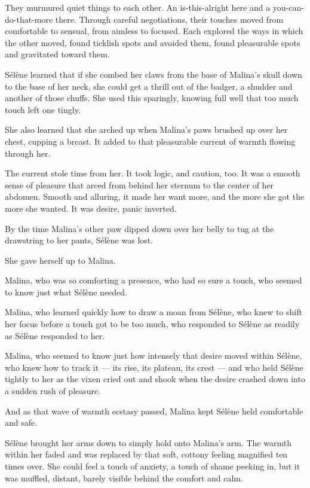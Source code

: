 They murmured quiet things to each other. An is-this-alright here and a you-can-do-that-more there. Through careful negotiations, their touches moved from comfortable to sensual, from aimless to focused. Each explored the ways in which the other moved, found ticklish spots and avoided them, found pleasurable spots and gravitated toward them.

Sélène learned that if she combed her claws from the base of Malina's skull down to the base of her neck, she could get a thrill out of the badger, a shudder and another of those chuffs. She used this sparingly, knowing full well that too much touch left one tingly.

She also learned that she arched up when Malina's paws brushed up over her chest, cupping a breast. It added to that pleasurable current of warmth flowing through her.

The current stole time from her. It took logic, and caution, too. It was a smooth sense of pleasure that arced from behind her sternum to the center of her abdomen. Smooth and alluring, it made her want more, and the more she got the more she wanted. It was desire, panic inverted.

By the time Malina's other paw dipped down over her belly to tug at the drawstring to her pants, Sélène was lost.

She gave herself up to Malina.

Malina, who was so comforting a presence, who had so sure a touch, who seemed to know just what Sélène needed.

Malina, who learned quickly how to draw a moan from Sélène, who knew to shift her focus before a touch got to be too much, who responded to Sélène as readily as Sélène responded to her.

Malina, who seemed to know just how intensely that desire moved within Sélène, who knew how to track it --- its rise, its plateau, its crest --- and who held Sélène tightly to her as the vixen cried out and shook when the desire crashed down into a sudden rush of pleasure.

And as that wave of warmth ecstasy passed, Malina kept Sélène held comfortable and safe.

Sélène brought her arms down to simply hold onto Malina's arm. The warmth within her faded and was replaced by that soft, cottony feeling magnified ten times over. She could feel a touch of anxiety, a touch of shame peeking in, but it was muffled, distant, barely visible behind the comfort and calm.

